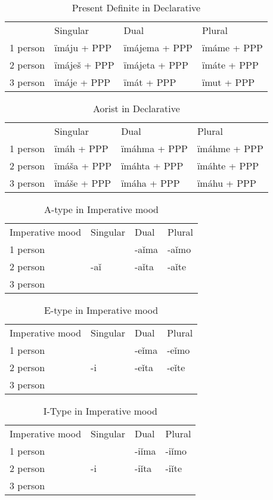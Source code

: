 \begin{table}[!htpb]
	\caption{Present Definite in Declarative}
	\begin{tabular}{llll}
		 & Singular & Dual & Plural \\
		1 person & ïmáju + PPP & ïmájema + PPP & ïmáme + PPP \\
		2 person & ïmáješ + PPP & ïmájeta + PPP & ïmáte + PPP \\
		3 person & ïmáje + PPP & ïmát + PPP & ïmut + PPP
	\end{tabular}
\end{table}

\begin{table}[!htpb]
	\caption{Aorist in Declarative}
	\begin{tabular}{llll}
		& Singular & Dual & Plural \\
		1 person & ïmáh + PPP & ïmáhma + PPP & ïmáhme + PPP \\
		2 person & ïmáša + PPP & ïmáhta + PPP & ïmáhte + PPP \\
		3 person & ïmáše + PPP & ïmáha + PPP & ïmáhu + PPP
	\end{tabular}
\end{table}


\begin{table}[!htpb]
	\caption{A-type in Imperative mood}
	\begin{tabular}{llll}
		Imperative mood & Singular & Dual & Plural \\
		1 person &  & -aǐma & -aǐmo \\
		2 person & -aǐ & -aǐta & -aǐte \\
		3 person &  &  & 
	\end{tabular}
\end{table}

\begin{table}[!htpb]
	\caption{E-type in Imperative mood}
	\begin{tabular}{llll}
		Imperative mood & Singular & Dual & Plural \\
		1 person &  & -eǐma & -eǐmo \\
		2 person & -i & -eǐta & -eǐte \\
		3 person &  &  & 
	\end{tabular}
\end{table}

\begin{table}[!htpb]
	\caption{I-Type in Imperative mood}
	\begin{tabular}{llll}
		Imperative mood & Singular & Dual & Plural \\
		1 person &  & -iǐma & -iǐmo \\
		2 person & -i & -iǐta & -iǐte \\
		3 person &  &  & 
	\end{tabular}
\end{table}

